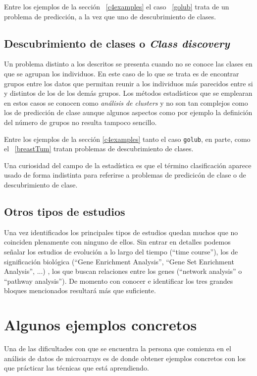 Entre los ejemplos de la secci\'on ~\ref{c4examples} el caso  ~\ref{golub} trata de un problema de predicci\'on, a la vez que uno de descubrimiento de clases.

\subsection{Descubrimiento de clases o \emph{Class discovery}}

Un problema distinto a los descritos se presenta cuando no se conoce las clases en que se agrupan los individuos. En este caso de lo que se trata es de encontrar grupos entre los datos que permitan reunir a los individuos m\'as parecidos entre si y distintos de los de los dem\'as grupos. Los m\'etodos estad\'isticos que se emplearan en estos casos se conocen como \emph{an\'alisis de clusters} y no son tan complejos como los de predicci\'on de clase aunque algunos aspectos como por ejemplo la definici\'on del n\'umero de grupos no resulta tampoco sencillo.

Entre los ejemplos de la secci\'on \ref{c4examples} tanto el caso \texttt{golub}, en parte, como el ~\ref{breastTum}  tratan problemas de descubrimiento de clases.

Una curiosidad del campo de la estad\'istica es que el t\'ermino clasificaci\'on aparece usado de forma indistinta para referirse a problemas de predicic\'on de clase o de descubrimiento de clase.

\subsection{Otros tipos de estudios}

Una vez identificados los principales tipos de estudios quedan muchos que no coinciden plenamente con ninguno de ellos. Sin entrar en detalles podemos se\~nalar los estudios de evoluci\'on a lo largo del tiempo  (``time course''), los de significaci\'on biol\'ogica (``Gene Enrichment Analysis'', ``Gene Set Enrichment Analysis'', ...) , los que buscan relaciones entre los genes (``network analysis'' o ``pathway analysis''). De momento con conocer e identificar los tres grandes bloques mencionados resultar\'a m\'as que suficiente.


\section{Algunos ejemplos concretos \label{c4examples}}

Una de las dificultades con que se encuentra la persona que comienza en el an\'alisis de datos de microarrays es de donde obtener ejemplos concretos con los que pr\'acticar las t\'ecnicas que est\'a aprendiendo.

